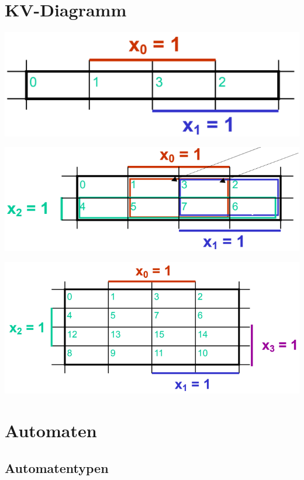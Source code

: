 \documentclass[a5paper,12pt,twoside]{scrartcl}
\begin{document}
\section{KV-Diagramm}

\begin{minipage}{.43\linewidth}
  \includegraphics[width=\textwidth]{KV_Diagramm_2Eingangsvariablen}
\end{minipage}\hfill\vline\hfill%
\begin{minipage}{.53\linewidth}
  \includegraphics[width=\textwidth]{KV_Diagramm_3Eingangsvariablen}
\end{minipage}
{\centering%
  \includegraphics[width=.7\textwidth]{KV_Diagramm_4Eingangsvariablen}\par%
}

\section{Automaten}

\subsection{Automatentypen}
\end{document}
